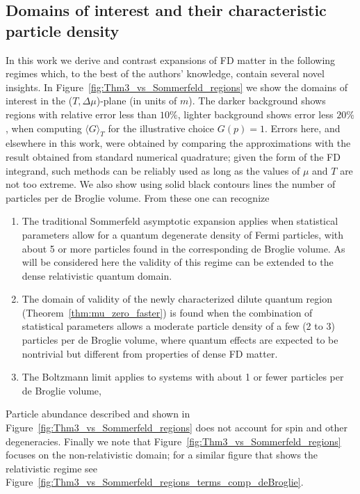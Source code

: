\documentclass[sn-mathphys,Numbered]{sn-jnl}
\newcommand{\rf}[1]{Figure~{\ref{#1}}}
\newcommand*{\xgreen}{\color{green}}
\newcommand{\rTh}[1]{Theorem~{\ref{#1}}}
\begin{document}
\subsection{Domains of interest and their characteristic  particle density}\label{domains}
In this work we derive and contrast expansions of FD matter in the following regimes which, to the best of the authors' knowledge, contain several novel insights. In \rf{fig:Thm3_vs_Sommerfeld_regions} we show the domains of interest in the ($T,\Delta\mu$)-plane (in units of $m$). The  darker background shows regions with relative error less than $10\%$, lighter background shows error less $20\%$, when computing $\langle G\rangle_T$ for the illustrative choice $G(p)=1$. Errors here, and elsewhere in this work, were obtained by comparing the approximations with the result obtained from standard numerical quadrature; given the form of the FD integrand, such methods can be reliably used as long as the values of $\mu$ and $T$ are not too extreme.  We also show using solid black contours lines the number of particles per de Broglie volume. From these one can recognize
\begin{enumerate}
\item
The traditional Sommerfeld asymptotic expansion applies when statistical parameters allow for a quantum degenerate density of Fermi particles, with about 5 or more particles found in the corresponding de Broglie volume. As will be considered here the validity of this regime can be extended to the dense relativistic quantum domain. 
\item 
The domain of validity of the newly characterized dilute quantum region (\rTh{thm:mu_zero_faster}) is found when the combination of statistical parameters allows a moderate particle density of a few (2 to 3) particles per de Broglie volume, where quantum effects are expected to be nontrivial but different from properties of  dense FD matter. 
\item
The Boltzmann limit applies to systems with about 1  or fewer particles per de Broglie volume, 
\end{enumerate}
Particle abundance described and shown in \rf{fig:Thm3_vs_Sommerfeld_regions} does not account for spin and other degeneracies.  Finally we note that \rf{fig:Thm3_vs_Sommerfeld_regions}  focuses on the non-relativistic domain; for a similar figure that shows the relativistic regime see \rf{fig:Thm3_vs_Sommerfeld_regions_terms_comp_deBroglie}.
\end{document}
